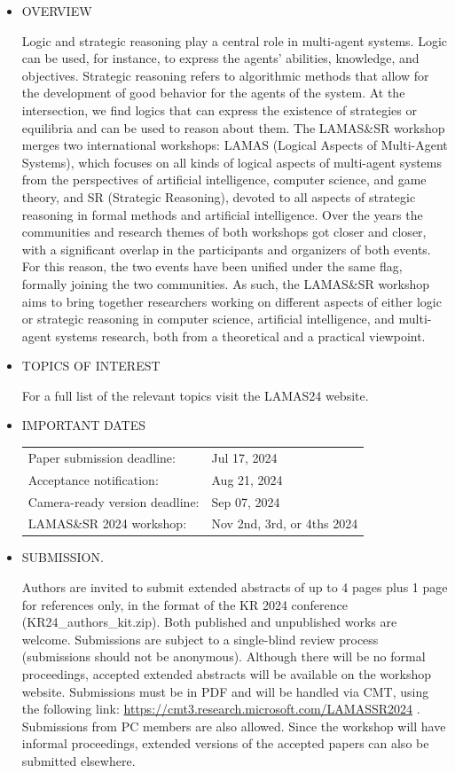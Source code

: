 \documentclass[prodmode,acmtecs]{acmsmall} %
\begin{document}
\begin{itemize}\item  OVERVIEW 
 
  Logic and strategic reasoning play a central role in multi-agent systems. Logic can be used, for instance, to express the agents' abilities, knowledge, and objectives. Strategic reasoning refers to algorithmic methods that allow for the development of good behavior for the agents of the system. At the intersection, we find logics that can express the existence of strategies or equilibria and can be used to reason about them. The LAMAS\&SR workshop merges two international workshops: LAMAS (Logical Aspects of Multi-Agent Systems), which focuses on all kinds of logical aspects of multi-agent systems from the perspectives of artificial intelligence, computer science, and game theory, and SR (Strategic Reasoning), devoted to all aspects of strategic reasoning in formal methods and artificial intelligence. Over the years the communities and research themes of both workshops got closer and closer, with a significant overlap in the participants and organizers of both events. For this reason, the two events have been unified under the same flag, formally joining the two communities. As such, the LAMAS\&SR workshop aims to bring together researchers working on different aspects of either logic or strategic reasoning in computer science, artificial intelligence, and multi-agent systems research, both from a theoretical and a practical viewpoint. 
 
\item  TOPICS OF INTEREST 
 
  For a full list of the relevant topics visit the LAMAS24 website.  
 
\item  IMPORTANT DATES 
 
\begin{tabulary}{\linewidth}{LL}Paper submission deadline:  & Jul 17, 2024 \\
Acceptance notification:  & Aug 21, 2024 \\
Camera-ready version deadline:  & Sep 07, 2024 \\
LAMAS\&SR 2024 workshop:  & Nov 2nd, 3rd, or 4ths 2024 \\
\end{tabulary}
 
\item  SUBMISSION. 
 
  Authors are invited to submit extended abstracts of up to 4 pages plus 1 page for references only, in the format of the KR 2024 conference (KR24\_authors\_kit.zip). Both published and unpublished works are welcome. Submissions are subject to a single-blind review process (submissions should not be anonymous). Although there will be no formal proceedings, accepted extended abstracts will be available on the workshop website. Submissions must be in PDF and will be handled via CMT, using the following link: \href{https://cmt3.research.microsoft.com/LAMASSR2024}{https://cmt3.research.microsoft.com/LAMASSR2024} . Submissions from PC members are also allowed. Since the workshop will have informal proceedings, extended versions of the accepted papers can also be submitted elsewhere. 
 

\end{itemize}
\end{document}
